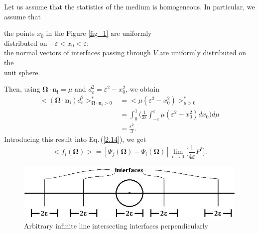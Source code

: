 \documentclass[12pt]{article}
\newcommand{\ep}{\varepsilon}
\newcommand{\bl}{\big<}
\newcommand{\bg}{\big>}
\begin{document}
Let us assume that the statistics of the medium is homogeneous.
In particular, we assume that
\begin{tabbing}
\hspace{0.8 cm}{\textrm 1)} the points $x_0$ in the Figure \ref{fig_1} are uniformly\\ \hspace{1.23 cm}distributed on
$-\ep<x_0<\ep$;
\\
\hspace{0.8 cm}{\textrm 2)} the normal vectors of interfaces passing through $V$ are uniformly distributed on the \\ \hspace{1.23 cm}unit sphere.
\end{tabbing}
 Then, using $\bm\Omega\cdot\bm{n_i} = \mu$ and $d_\ep^2 = \ep^2-x_0^2$, we obtain
\begin{equation}
\begin{split}
\bl(\bm\Omega\cdot\bm{n_i})d_\ep^2\bg^*_{\bm\Omega\cdot\bm{n_i}>0} &=
\bl \mu(\ep^2-x_0^2)\bg^*_{\mu>0} 
\\&
=\int_0^1\bigg(\frac{1}{2\ep}\int_{-\ep}^\ep \mu(\ep^2-x_0^2)dx_0\bigg)d\mu 
\\& =
\frac{\ep^2}{3}.
\end{split}
\end{equation}
 Introducing this result into Eq.$\,$(\ref{2.14}), we get
\begin{equation}\label{3.2}
\bl f_i (\bm\Omega) \bg
= [\Psi_j(\bm\Omega)-\Psi_i(\bm\Omega)]\lim_{\epsilon\rightarrow 0}
\bigg[\frac{1}{4\ep}P^*\bigg].
\end{equation}
\begin{figure}[h]
\centering
\includegraphics[height=2.5 cm,width=10 cm]{fig_2.jpg}
\caption{Arbitrary infinite line intersecting interfaces perpendicularly}\label{fig_2}
\end{figure}
\end{document}
